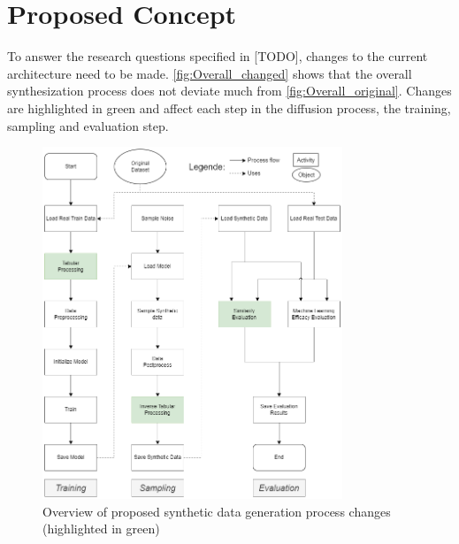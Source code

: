 \section{Proposed Concept}
\label{ch:conceptualDesign-changes}

To answer the research questions specified in [TODO], changes to the current architecture need to be made.
\autoref{fig:Overall_changed} shows that the overall synthesization process does not deviate much from \autoref{fig:Overall_original}.
Changes are highlighted in green and affect each step in the diffusion process, the training, sampling and evaluation step.

\begin{figure}[h]
    \centering
    \includegraphics[width=0.8\textwidth]{images/Overall_changed.png}
    \caption{Overview of proposed synthetic data generation process changes (highlighted in green)}
    \label{fig:Overall_changed}
\end{figure}

